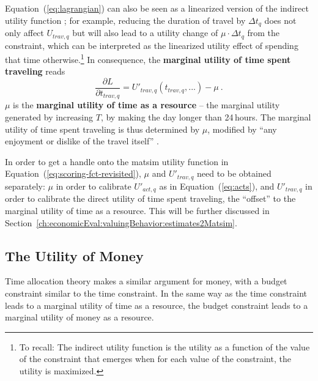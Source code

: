 Equation~(\ref{eq:lagrangian}) can also be seen as a linearized version of the indirect utility function%
%
%
%
; for example, reducing the duration of travel by $\Delta t_q$ does not only affect $U_{trav,q}$ but will also lead to a utility change of $ \mu \cdot \Delta t_q$ from the constraint, which can be interpreted as the linearized utility effect of spending that time otherwise.\footnote{%
%
To recall: The indirect utility function is the utility as a function of the value of the constraint that emerges when for each value of the constraint, the utility is maximized.
%
}
%
In consequence, the \textbf{marginal utility of time spent traveling} reads
%
\begin{equation}
\frac{\partial L}{\partial t_{trav,q}} = U'_{trav,q}(t_{trav,q},...) - \mu \ .
\label{eq:marg-UoT}
\end{equation}
%
$\mu$ is the \textbf{marginal utility of time as a resource} -- the marginal utility generated by increasing $T$, \ie by making the day longer than 24\,hours. The marginal utility of time spent traveling is thus determined by $\mu$, modified by ``any enjoyment or dislike of the travel itself'' \citep{Small2012ValuationOfTimeRevisited}.

In order to get a handle onto the \acrshort{matsim} utility function in Equation~(\ref{eq:scoring-fct-revisited}), $\mu$ and $U'_{trav,q}$ need to be obtained separately: $\mu$ in order to calibrate $U'_{act,q}$ as in Equation~(\ref{eq:acts}), and $U'_{trav,q}$ in order to calibrate the direct utility of time spent traveling, the ``offset'' to the marginal utility of time as a resource.
%
This will be further discussed in Section~\ref{ch:economicEval:valuingBehavior:estimates2Matsim}.


\subsection{The Utility of Money}
\label{ch:economicEval:valuingBehavior:uom}
Time allocation theory \citep{DeSerpa1997economicsOfTime, Jara-DiazGuevara-2003} makes a similar argument for money, with a budget constraint similar to the time constraint.
%
In the same way as the time constraint leads to a marginal utility of time as a resource, the budget constraint leads to a marginal utility of money as a resource.

